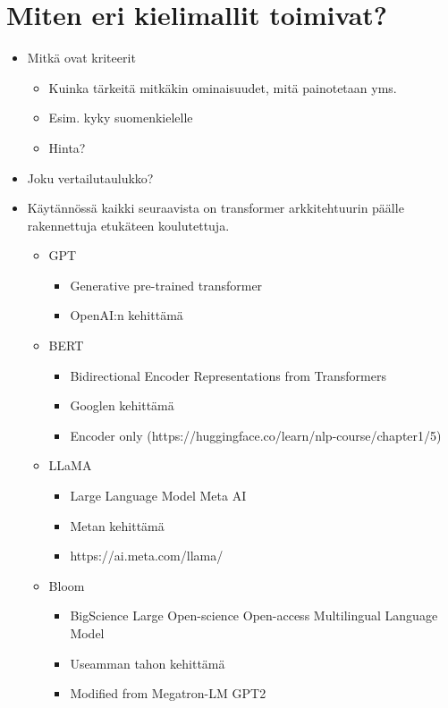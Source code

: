 \chapter{Miten eri kielimallit toimivat?}%
\label{ch:vertailu}

\begin{itemize}
  \item Mitkä ovat kriteerit
  \begin{itemize}
    \item Kuinka tärkeitä mitkäkin ominaisuudet, mitä painotetaan yms.
    \item Esim. kyky suomenkielelle
    \item Hinta?
  \end{itemize}
  \item Joku vertailutaulukko?
  \item  Käytännössä kaikki seuraavista on transformer arkkitehtuurin päälle rakennettuja etukäteen koulutettuja.
  \begin{itemize}
    \item GPT
    \begin{itemize}
      \item Generative pre-trained transformer
      \item OpenAI:n kehittämä
    \end{itemize}
    \item BERT
    \begin{itemize}
      \item Bidirectional Encoder Representations from Transformers
      \item Googlen kehittämä
      \item Encoder only (https://huggingface.co/learn/nlp-course/chapter1/5)
    \end{itemize}
    \item LLaMA
    \begin{itemize}
      \item Large Language Model Meta AI
      \item Metan kehittämä
      \item https://ai.meta.com/llama/
    \end{itemize}
    \item Bloom
    \begin{itemize}
      \item BigScience Large Open-science Open-access Multilingual Language Model
      \item Useamman tahon kehittämä
      \item Modified from Megatron-LM GPT2

\end{itemize}
\end{itemize}
\end{itemize}
